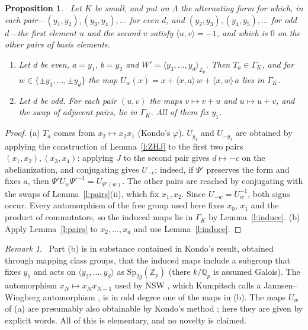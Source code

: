 \documentclass[11pt,a4paper]{article}
\newcommand{\Zp}{\mathbb{Z}_p}
\newcommand{\Qp}{\mathbb{Q}_p}
\newcommand{\Sp}{\mathrm{Sp}}
\newcommand{\ip}[2]{\langle #1,#2\rangle}
\newcommand{\lab}[2]{{\upshape\fcolorbox{#1}{#1!8}{\scriptsize\sffamily\bfseries\textcolor{#1}{#2}}}}
\newcommand{\tagS}{\lab{blue}{S}}
\newcommand{\tagP}{\lab{ForestGreen}{P}}
\theoremstyle{plain}
\newtheorem{proposition}[theorem]{Proposition}
\theoremstyle{definition}
\theoremstyle{remark}
\newtheorem{remark}[theorem]{Remark}
\begin{document}
\begin{proposition}\label{p:gens}
\tagP\ Let $K$ be small, and put on $\Lambda$ the alternating form for which, in each pair---$(y_1,y_2),(y_3,y_4),
\dots$ for even $d$, and $(y_2,y_3),(y_4,y_5),\dots$ for odd $d$---the first element $u$ and the second $v$ satisfy
$\ip uv=-1$, and which is $0$ on the other pairs of basis elements.
\begin{enumerate}[label=(\alph*)]
\item Let $d$ be even, $a=y_1$, $b=y_2$ and $W'=\langle y_3,\dots,y_d\rangle_{\Zp}$. Then $T_a\in\Gamma_K$, and for
$w\in\{\pm y_3,\dots,\pm y_d\}$ the map $U_w(x)=x+\ip xa\,w+\ip xw\,a$ lies in $\Gamma_K$.
\item Let $d$ be odd. For each pair $(u,v)$ the maps $v\mapsto v+u$ and $u\mapsto u+v$, and the swap of adjacent
pairs, lie in $\Gamma_K$. All of them fix $y_1$.
\end{enumerate}
\end{proposition}
\begin{proof}
(a) $T_a$ comes from $x_2\mapsto x_2x_1$ (Kondo's $\varphi$). $U_{y_4}$ and $U_{-y_3}$ are obtained by applying the
construction of Lemma~\ref{l:ZHJ} to the first two pairs $(x_1,x_2),(x_3,x_4)$: applying $J$ to the second pair
gives $d\mapsto-c$ on the abelianization, and conjugating gives $U_{-c}$; indeed, if $\Psi'$ preserves the form and
fixes $a$, then $\Psi'U_w\Psi'^{-1}=U_{\Psi'(w)}$. The other pairs are reached by conjugating with the swaps of
Lemma~\ref{l:pairs}(ii), which fix $x_1,x_2$. Since $U_{-w}=U_w^{-1}$, both signs occur. Every automorphism of the
free group used here fixes $x_0$, $x_1$ and the product of commutators, so the induced maps lie in $\Gamma_K$ by
Lemma~\ref{l:induce}. (b) Apply Lemma~\ref{l:pairs} to $x_2,\dots,x_d$ and use Lemma~\ref{l:induce}.
\end{proof}

\begin{remark}\label{r:mcg}
\tagS\ Part (b) is in substance contained in Kondo's result, obtained through mapping class groups, that the induced
maps include a subgroup that fixes $y_1$ and acts on $\langle y_2,\dots,y_d\rangle$ as $\Sp_{2g}(\Zp)$
\cite[Rem.~2.18, proof of Thm.~2.19]{Kondo} (there $k/\Qp$ is assumed Galois). The automorphism $x_N\mapsto x_Nx_{N-1}$
used by NSW \cite[p.~421]{NSW}, which Kumpitsch calls a Jannsen--Wingberg automorphism \cite[\S3.2.2]{Ku}, is in odd
degree one of the maps in (b). The maps $U_w$ of (a) are presumably also obtainable by Kondo's method
\cite[Rem.~2.21]{Kondo}; here they are given by explicit words. All of this is elementary, and no novelty is claimed.
\end{remark}
\end{document}
